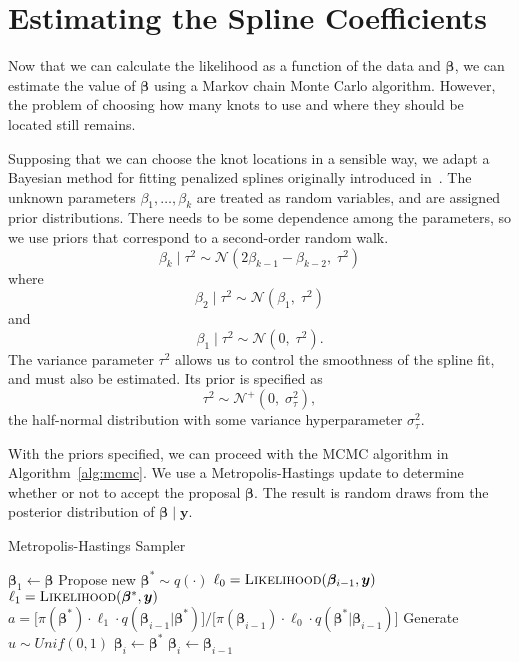 
\section{Estimating the Spline Coefficients} %
\label{sec:estimating_the_spline_coefficients}

Now that we can calculate the likelihood as a function of the data and $\bm{\beta}$, we can estimate the value of $\bm{\beta}$ using a Markov chain Monte Carlo algorithm. However, the problem of choosing how many knots to use and where they should be located still remains.

Supposing that we can choose the knot locations in a sensible way, we adapt a Bayesian method for fitting penalized splines originally introduced in~\cite{lang2004bayesian}. The unknown parameters $\beta_1, \dots, \beta_k$ are treated as random variables, and are assigned prior distributions. There needs to be some dependence among the parameters, so we use priors that correspond to a second-order random walk.
\[
	\beta_k \;|\; \tau^2 \sim \mathcal{N}(2\beta_{k-1} - \beta_{k-2}, \; \tau^2)
\]
where
\[
	\beta_2 \;|\; \tau^2 \sim \mathcal{N}(\beta_1, \; \tau^2)
\]
and
\[
	\beta_1 \;|\; \tau^2 \sim \mathcal{N}(0, \; \tau^2).
\]
The variance parameter $\tau^2$ allows us to control the smoothness of the spline fit, and must also be estimated. Its prior is specified as
\[
	\tau^2 \sim \mathcal{N}^+(0, \; \sigma^2_\tau),
\]
the half-normal distribution with some variance hyperparameter $\sigma^2_\tau$.

With the priors specified, we can proceed with the MCMC algorithm in Algorithm~\ref{alg:mcmc}. We use a Metropolis-Hastings update to determine whether or not to accept the proposal $\bm{\beta}$. The result is random draws from the posterior distribution of $\bm{\beta} \;|\; \bm{y}$.

\begin{algorithm}[!htb]
	\caption{\small Metropolis-Hastings Sampler} \label{alg:mcmc}
	\begin{algorithmic}[1]
		\State $\bm{\beta}_1 \gets \bm{\beta}$
		\State Propose new $\bm{\beta}^* \sim q(\cdot)$
		\State $\ell_0 = \textsc{Likelihood}(\bm{\beta}_{i-1}, \bm{y})$
		\State $\ell_1 = \textsc{Likelihood}(\bm{\beta}^*, \bm{y})$
		\State $a = \Big[\pi(\bm{\beta}^*) \cdot \ell_1 \cdot q(\bm{\beta}_{i-1}|\bm{\beta}^*)\Big]/\Big[\pi(\bm{\beta}_{i-1}) \cdot \ell_0 \cdot q(\bm{\beta}^*|\bm{\beta}_{i-1})\Big]$
		\State Generate $u \sim Unif(0, 1)$
		\State $\bm{\beta}_i \gets \bm{\beta}^*$
		\Else
		\State $\bm{\beta}_i \gets \bm{\beta}_{i-1}$
		\EndIf
		\EndFor
		\EndProcedure
	\end{algorithmic}
\end{algorithm} 

